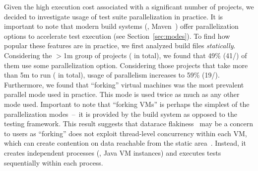 Given the high execution cost associated with a significant number of
\github{} projects, we decided to investigate usage of test
suite parallelization in practice.  It is important to note that modern build
systems (\eg{}, Maven~\cite{maven}) offer parallelization options to
accelerate test execution (see Section~\ref{sec:modes}).  To find how
popular these features are in practice, we first analyzed build files
\emph{statically}.  Considering the $>$1m group of projects
(\numMedLong{} in total), we found that 49\% (41/\numMedLong{}) of
them use some parallelization option.  Considering those projects that
take more than 5m to run (\numLong{} in total), usage of parallelism
increases to 59\% (19/\numLong{}).  Furthermore, we found that
``forking'' virtual machines was the most prevalent parallel mode used
in practice.  This mode is used twice as much as any other mode used.
Important to note that ``forking VMs'' is perhaps the simplest of the
parallelization modes~--~it is provided by the build system as opposed
to the testing framework.  This result suggests that datarace
flakiness~\cite{luo-etal-fse2014} may be a concern to users as
``forking'' does not exploit thread-level concurrency within each VM,
which can create contention on data reachable from the static
area~\cite{bell-kaiser-icse2014,bell-etal-esecfse2015}.  Instead, it
creates independent processes (\ie{}, Java VM instances) and executes
tests sequentially within each process. 



